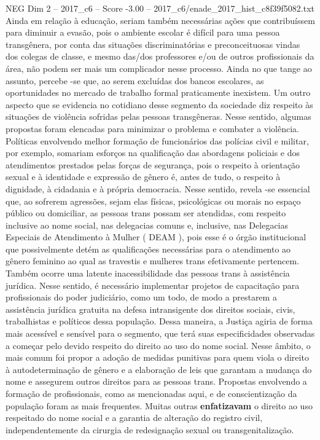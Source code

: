 \begin{textsample}{NEG Dim 2 – 2017\_c6 – Score -3.00 – 2017\_c6/enade\_2017\_hist\_c8f39f5082.txt}
Ainda em relação à educação, seriam também necessárias ações que contribuíssem para diminuir a evasão, pois o ambiente escolar é difícil para uma pessoa transgênera, por conta das situações discriminatórias e preconceituosas vindas dos colegas de classe, e mesmo das/dos professores e/ou de outros profissionais da área, não podem ser mais um complicador nesse processo.
Ainda no que tange ao assunto, percebe -se que, ao serem excluídas dos bancos escolares, as oportunidades no mercado de trabalho formal praticamente inexistem.
Um outro aspecto que se evidencia no cotidiano desse segmento da sociedade diz respeito às situações de violência sofridas pelas pessoas transgêneras.
Nesse sentido, algumas propostas foram elencadas para minimizar o problema e combater a violência.
Políticas envolvendo melhor formação de funcionários das polícias civil e militar, por exemplo, somariam esforços na qualificação das abordagens policiais e dos atendimentos prestados pelas forças de segurança, pois o respeito à orientação sexual e à identidade e expressão de gênero é, antes de tudo, o respeito à dignidade, à cidadania e à própria democracia.
Nesse sentido, revela -se essencial que, ao sofrerem agressões, sejam elas físicas, psicológicas ou morais no espaço público ou domiciliar, as pessoas trans possam ser atendidas, com respeito inclusive ao nome social, nas delegacias comuns e, inclusive, nas Delegacias Especiais de Atendimento à Mulher ( DEAM ), pois esse é o órgão institucional que possivelmente detém as qualificações necessárias para o atendimento ao gênero feminino ao qual as travestis e mulheres trans efetivamente pertencem.
Também ocorre uma latente inacessibilidade das pessoas trans à assistência jurídica.
Nesse sentido, é necessário implementar projetos de capacitação para profissionais do poder judiciário, como um todo, de modo a prestarem a assistência jurídica gratuita na defesa intransigente dos direitos sociais, civis, trabalhistas e políticos dessa população.
Dessa maneira, a Justiça agiria de forma mais acessível e sensível para o segmento, que terá suas especificidades observadas a começar pelo devido respeito do direito ao uso do nome social.
Nesse âmbito, o mais comum foi propor a adoção de medidas punitivas para quem viola o direito à autodeterminação de gênero e a elaboração de leis que garantam a mudança do nome e assegurem outros direitos para as pessoas trans.
Propostas envolvendo a formação de profissionais, como as mencionadas aqui, e de conscientização da população foram as mais frequentes.
Muitas outras \textbf{enfatizavam} o direito ao uso respeitado do nome social e a garantia de alteração do registro civil, independentemente da cirurgia de redesignação sexual ou transgenitalização.

\end{textsample}
